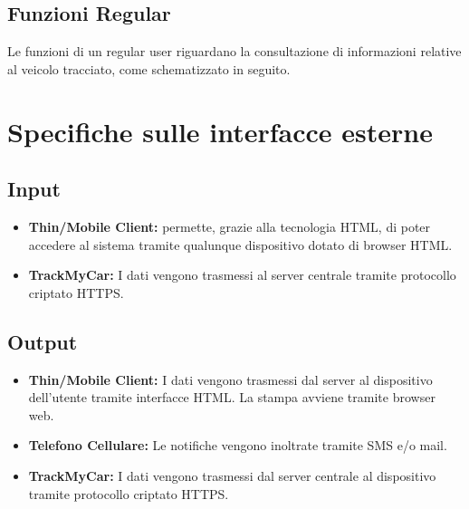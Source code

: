 \documentclass[a4paper,12pt]{article}
\begin{document}
\pagebreak

\subsection{Funzioni Regular}
Le funzioni di un regular user riguardano la consultazione di informazioni relative al veicolo tracciato, come schematizzato in seguito.
\begin{center}
\end{center}


\section{Specifiche sulle interfacce esterne}
\subsection{Input}
\begin{itemize}
\item \textbf{Thin/Mobile Client:} permette, grazie alla tecnologia HTML, di poter accedere al sistema tramite qualunque dispositivo dotato di browser HTML.
\item \textbf{TrackMyCar:} I dati vengono trasmessi al server centrale tramite protocollo criptato HTTPS.
\end{itemize}
\subsection{Output}
\begin{itemize}
\item \textbf{Thin/Mobile Client:} I dati vengono trasmessi dal server al dispositivo dell'utente tramite interfacce HTML. La stampa avviene tramite browser web.
\item \textbf{Telefono Cellulare:} Le notifiche vengono inoltrate tramite SMS e/o mail.
\item \textbf{TrackMyCar:} I dati vengono trasmessi dal server centrale al dispositivo tramite protocollo criptato HTTPS.
\end{itemize}
\end{document}
